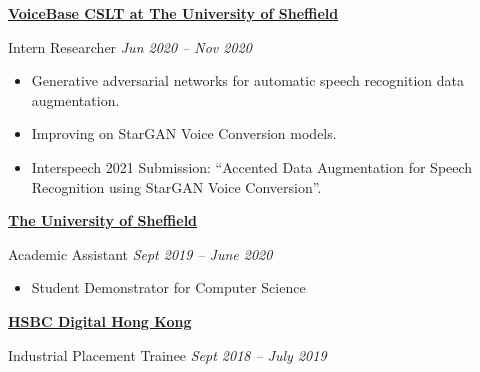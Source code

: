 \documentclass[10pt]{article} %
\begin{document}
\begin{changemargin}{0pt}{0.5pt}
\begin{minipage}[t]{0.5\textwidth}
\begin{changemargin}{1pt}{1pt}

\vspace{5pt}
\underline{\textbf{VoiceBase CSLT at The University of Sheffield}}\\
\par
\vspace{-10pt}
Intern Researcher \hfill \textit{Jun 2020 -- Nov 2020}\\
\vspace{-15pt}

\begin{itemize} \itemsep-2pt %
  \item Generative adversarial networks for automatic speech recognition data augmentation.
  \item Improving on StarGAN Voice Conversion models.
  \item Interspeech 2021 Submission: \enquote{Accented Data Augmentation for Speech Recognition using StarGAN Voice Conversion}.
\end{itemize}


\vspace{5pt}
\underline{\textbf{The University of Sheffield}}\\
\par
\vspace{-10pt}
Academic Assistant \hfill \textit{Sept 2019 -- June 2020}\\
\vspace{-15pt}

\begin{itemize} \itemsep-2pt %
  \item Student Demonstrator for Computer Science 
\end{itemize}


\vspace{5pt}
\underline{\textbf{HSBC Digital Hong Kong}}\\
\par
\vspace{-10pt}
 Industrial Placement Trainee \textit{\hfill Sept 2018 -- July 2019} \\
\vspace{-15pt}


\end{changemargin}
\end{minipage}
\end{changemargin}
\end{document}
